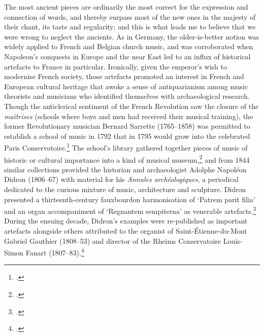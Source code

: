   {\cite[3]{PoissonTraitetheoriquepratique1750}}
{The most ancient pieces are ordinarily the most correct for the expression and connection of words, and thereby \linebreak{}surpass most of the new ones in the majesty of their chant, its taste and regularity; and this is what leads me to believe that we were wrong to neglect the ancients.}
%
\noindent
As in Germany, the older-is-better notion was widely applied to French and Belgian church music, and was corroborated when Napoleon's conquests in Europe and the near East led to an influx of historical artefacts to France in particular.
Ironically, given the emperor's wish to modernise French society, those artefacts promoted an interest in French and European cultural heritage that awoke a sense of antiquarianism among music theorists and musicians who identified themselves with archaeological research.
Though the anticlerical sentiment of the French Revolution saw the closure of the \emph{maîtrises} (schools where boys and men had received their musical training), the former Revolutionary musician Bernard Sarrette (1765--1858) was permitted to establish a school of music in 1792 that in 1795 would grow into the celebrated Paris Conservatoire.\footcite[200]{ChouquetMaitrise1880}
The school's library gathered together pieces of music of historic or cultural importance into a kind of musical museum,\footcite[4]{EllisInterpretingMusicalEarly2005} and from 1844 similar collections provided the historian and archaeologist Adolphe Napoléon Didron (1806--67) with material for his \emph{Annales archéologiques}, a periodical dedicated to the curious mixture of music, architecture and sculpture.
Didron presented a thirteenth-century fauxbourdon harmonisation of `Patrem parit filia' and an organ accompaniment of `Regnantem sempiterna' as venerable artefacts.\footcite*[unpaginated supplements at pp.~248 and 318]{DidronRegnantemsempiterna1849}
During the ensuing decade, Didron's examples were re-published as important artefacts alongside others attributed to the organist of Saint-Étienne-du-Mont Gabriel Gauthier (1808--53) and director of the Rheims Conservatoire Louis-Simon Fanart (1807--83).\footcite[unpaginated supplement at p.~434]{VervoitteConsiderationschantecclesiastique1857}

